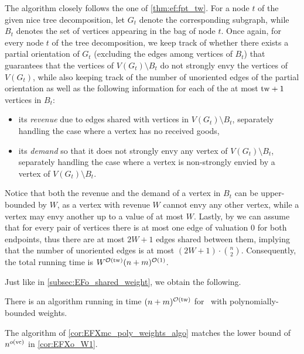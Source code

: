 \begin{proofsketch}
    The algorithm closely follows the one of \cref{thm:ef:fpt_tw}.
    For a node $t$ of the given nice tree decomposition, let $G_t$ denote the corresponding subgraph,
    while $B_t$ denotes the set of vertices appearing in the bag of node $t$.
    Once again, for every node $t$ of the tree decomposition, we keep track of whether there exists a partial orientation of $G_t$
    (excluding the edges among vertices of $B_t$)
    that guarantees that the vertices of $V(G_t) \setminus B_t$ do not strongly envy the vertices of $V(G_t)$,
    while also keeping track of the number of unoriented edges of the partial orientation
    as well as the following information for each of the at most $\mathrm{tw}+1$ vertices in $B_t$:
    \begin{itemize}
        \item its \emph{revenue} due to edges shared with vertices in $V(G_t) \setminus B_t$,
        separately handling the case where a vertex has no received goods,

        \item its \emph{demand} so that it does not strongly envy any vertex of $V(G_t) \setminus B_t$,
        separately handling the case where a vertex is non-strongly envied by a vertex of $V(G_t) \setminus B_t$.
    \end{itemize}
    Notice that both the revenue and the demand of a vertex in $B_t$ can be upper-bounded by $W$,
    as a vertex with revenue $W$ cannot envy any other vertex, while a vertex may envy another up to a value of at most $W$.
    Lastly, by  we can assume that for every pair of vertices there is at most one edge of valuation $0$
    for both endpoints,
    thus there are at most $2W + 1$ edges shared between them, implying that
    the number of unoriented edges is at most $(2W+1) \cdot \binom{n}{2}$.
    Consequently, the total running time is $W^{\mathcal{O}(\mathrm{tw})} (n+m)^{\mathcal{O}(1)}$.
\end{proofsketch}

Just like in \cref{subsec:EFo_shared_weight}, we obtain the following.

\begin{corollary}\label{cor:EFXmc_poly_weights_algo}
    There is an algorithm running in time $(n+m)^{\mathcal{O}(\mathrm{tw})}$ for \EFXmc\ with polynomially-bounded weights.
\end{corollary}

\begin{remark}
    The algorithm of \cref{cor:EFXmc_poly_weights_algo} matches the lower bound of $n^{o(\mathrm{vc})}$ in \cref{cor:EFXo_W1}.
\end{remark}



